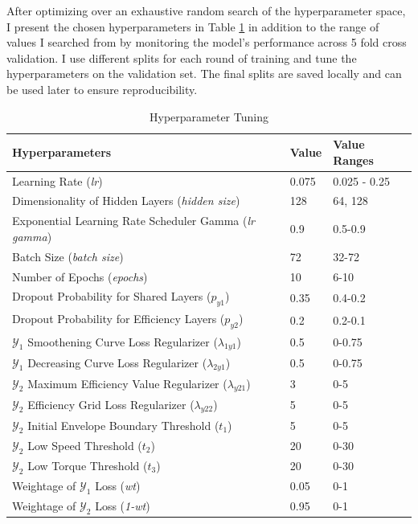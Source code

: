 \documentclass{report} %
\begin{document}
After optimizing over an exhaustive random search of the hyperparameter space, I present the chosen hyperparameters in Table \ref{tab:Hyperparameter Tunings} in addition 
to the range of values I searched from by monitoring the model's performance across 5 fold cross validation. I use different splits for each round of training and tune 
the hyperparameters on the validation set. The final splits are saved locally and can be used later to ensure reproducibility. 

\begin{table}[H]
    \centering
    \begin{tabularx}{\linewidth}{|p{}|p{}|p{}|}
    \hline {\bf Hyperparameters} & {\bf Value} & {\bf Value Ranges}\\
    \hline 
    Learning Rate (\textit{lr}) & 0.075 & 0.025 - 0.25\\
    Dimensionality of Hidden Layers (\textit{hidden size})& 128 & 64, 128\\
    Exponential Learning Rate Scheduler Gamma (\textit{lr gamma})& 0.9 & 0.5-0.9\\
    Batch Size (\textit{batch size})& 72 & 32-72\\
    Number of Epochs (\textit{epochs})& 10 & 6-10\\
    Dropout Probability for Shared Layers (\textit{$p_{y1}$})& 0.35 & 0.4-0.2\\
    Dropout Probability for Efficiency Layers (\textit{$p_{y2}$}) & 0.2 & 0.2-0.1\\
    $\mathcal{Y}_1$ Smoothening Curve Loss Regularizer (\textit{$\lambda_{1y1}$}) & 0.5 & 0-0.75\\
    $\mathcal{Y}_1$ Decreasing Curve Loss Regularizer (\textit{$\lambda_{2y1}$})& 0.5 & 0-0.75\\
    $\mathcal{Y}_2$ Maximum Efficiency Value Regularizer (\textit{$\lambda_{y21}$})& 3 & 0-5\\
    $\mathcal{Y}_2$ Efficiency Grid Loss Regularizer (\textit{$\lambda_{y22}$}) & 5 & 0-5\\
    $\mathcal{Y}_2$ Initial Envelope Boundary Threshold (\textit{$t_{1}$})& 5 & 0-5\\
    $\mathcal{Y}_2$ Low Speed Threshold (\textit{$t_{2}$})& 20 & 0-30\\
    $\mathcal{Y}_2$ Low Torque Threshold (\textit{$t_{3}$})& 20 & 0-30\\
    Weightage of $\mathcal{Y}_1$ Loss (\textit{wt})& 0.05 & 0-1\\
    Weightage of $\mathcal{Y}_2$ Loss (\textit{1-wt})& 0.95 & 0-1\\
    \hline
    \end{tabularx}
    \caption{Hyperparameter Tuning}
    \label{tab:Hyperparameter Tunings}
\end{table}
\end{document}
